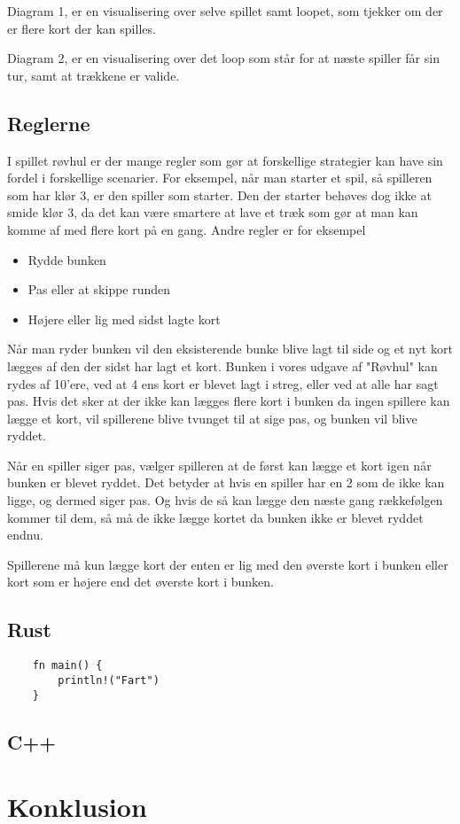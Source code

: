 \documentclass[a4paper, 12pt]{article}
\begin{document}
Diagram 1, er en visualisering over selve spillet samt loopet, som tjekker om der er flere kort der kan spilles.
\bigbreak

Diagram 2, er en visualisering over det loop som står for at næste spiller får sin tur, samt at trækkene er valide.

\vfill
\pagebreak


\subsection{Reglerne}
I spillet røvhul er der mange regler som gør at forskellige strategier kan have sin fordel i forskellige scenarier. For eksempel, når man starter et spil, så spilleren som har klør 3, er den spiller som starter. Den der starter behøves dog ikke at smide klør 3, da det kan være smartere at lave et træk som gør at man kan komme af med flere kort på en gang. Andre regler er for eksempel

\begin{itemize}
	\item Rydde bunken
	\item Pas eller at skippe runden
	\item Højere eller lig med sidst lagte kort
\end{itemize}

Når man ryder bunken vil den eksisterende bunke blive lagt til side og et nyt kort lægges af den der sidst har lagt et kort. Bunken i vores udgave af "Røvhul" kan rydes af 10'ere, ved at 4 ens kort er blevet lagt i streg, eller ved at alle har sagt pas. Hvis det sker at der ikke kan lægges flere kort i bunken da ingen spillere kan lægge et kort, vil spillerene blive tvunget til at sige pas, og bunken vil blive ryddet.

Når en spiller siger pas, vælger spilleren at de først kan lægge et kort igen når bunken er blevet ryddet. Det betyder at hvis en spiller har en 2 som de ikke kan ligge, og dermed siger pas. Og hvis de så kan lægge den næste gang rækkefølgen kommer til dem, så må de ikke lægge kortet da bunken ikke er blevet ryddet endnu.

Spillerene må kun lægge kort der enten er lig med den øverste kort i bunken eller kort som er højere end det øverste kort i bunken.

\subsection{Rust}


\begin{verbatim}
	fn main() {
		println!("Fart")
	}
\end{verbatim}


\subsection{C++}


\vfill
\pagebreak

\section{Konklusion}

\vfill
\pagebreak
\end{document}
